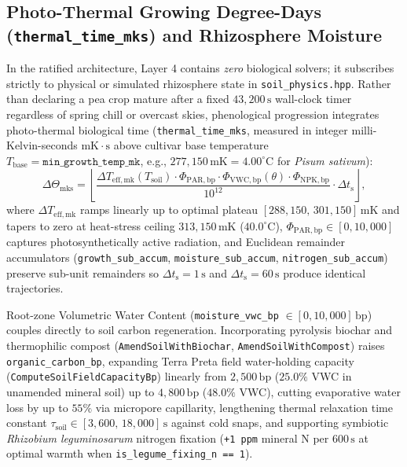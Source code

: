 \subsection{Photo-Thermal Growing Degree-Days (\texttt{thermal\_time\_mks}) and Rhizosphere Moisture}

In the ratified architecture, Layer 4 contains \emph{zero} biological solvers; it subscribes
strictly to physical or simulated rhizosphere state in \texttt{soil\_physics.hpp}. Rather than
declaring a pea crop mature after a fixed $43{,}200\,\mathrm{s}$ wall-clock timer regardless of
spring chill or overcast skies, phenological progression integrates photo-thermal biological
time (\texttt{thermal\_time\_mks}, measured in integer milli-Kelvin-seconds $\mathrm{mK\cdot s}$
above cultivar base temperature $T_{\mathrm{base}} = \texttt{min\_growth\_temp\_mk}$, e.g.,
$277{,}150\,\mathrm{mK} = 4.00^\circ\mathrm{C}$ for \emph{Pisum sativum}):
\begin{equation}
\label{eq:photo-thermal-mks}
\Delta \Theta_{\mathrm{mks}} = \left\lfloor
\frac{\Delta T_{\mathrm{eff,mk}}(T_{\mathrm{soil}}) \cdot \Phi_{\mathrm{PAR,bp}} \cdot \Phi_{\mathrm{VWC,bp}}(\theta) \cdot \Phi_{\mathrm{NPK,bp}}}{10^{12}}
\cdot \Delta t_{\mathrm{s}}
\right\rfloor,
\end{equation}
where $\Delta T_{\mathrm{eff,mk}}$ ramps linearly up to optimal plateau $[288{,}150,\,
301{,}150]\,\mathrm{mK}$ and tapers to zero at heat-stress ceiling $313{,}150\,\mathrm{mK}$
($40.0^\circ\mathrm{C}$), $\Phi_{\mathrm{PAR,bp}} \in [0, 10{,}000]$ captures photosynthetically
active radiation, and Euclidean remainder accumulators (\texttt{growth\_sub\_accum},
\texttt{moisture\_sub\_accum}, \texttt{nitrogen\_sub\_accum}) preserve sub-unit remainders so
$\Delta t_{\mathrm{s}} = 1\,\mathrm{s}$ and $\Delta t_{\mathrm{s}} = 60\,\mathrm{s}$ produce
identical trajectories.

Root-zone Volumetric Water Content (\texttt{moisture\_vwc\_bp} $\in [0, 10{,}000]\,\mathrm{bp}$)
couples directly to soil carbon regeneration. Incorporating pyrolysis biochar and thermophilic
compost (\texttt{AmendSoilWithBiochar}, \texttt{AmendSoilWithCompost}) raises
\texttt{organic\_carbon\_bp}, expanding Terra Preta field water-holding capacity
(\texttt{ComputeSoilFieldCapacityBp}) linearly from $2{,}500\,\mathrm{bp}$ ($25.0\%$ VWC in
unamended mineral soil) up to $4{,}800\,\mathrm{bp}$ ($48.0\%$ VWC), cutting evaporative water
loss by up to $55\%$ via micropore capillarity, lengthening thermal relaxation time constant
$\tau_{\mathrm{soil}} \in [3{,}600,\, 18{,}000]\,\mathrm{s}$ against cold snaps, and supporting
symbiotic \emph{Rhizobium leguminosarum} nitrogen fixation (\texttt{+1 ppm} mineral $\mathrm{N}$
per $600\,\mathrm{s}$ at optimal warmth when \texttt{is\_legume\_fixing\_n == 1}).


